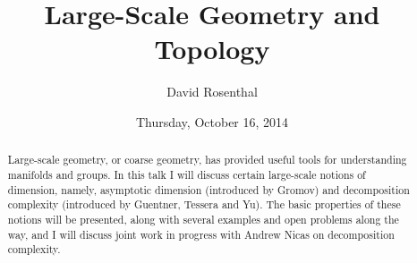 \documentclass{UAmathtalk}
\author{David Rosenthal}
\title{Large-Scale Geometry and Topology}
\date{Thursday, October 16, 2014}
\begin{document}
\maketitle

\begin{abstract}
Large-scale geometry, or coarse geometry, has provided useful tools for understanding manifolds and groups. In this talk I will discuss certain large-scale notions of dimension, namely, asymptotic dimension (introduced by Gromov) and decomposition complexity (introduced by Guentner, Tessera and Yu). The basic properties of these notions will be presented, along with several examples and open problems along the way, and I will discuss joint work in progress with Andrew Nicas on decomposition complexity.
\end{abstract}
\end{document}
